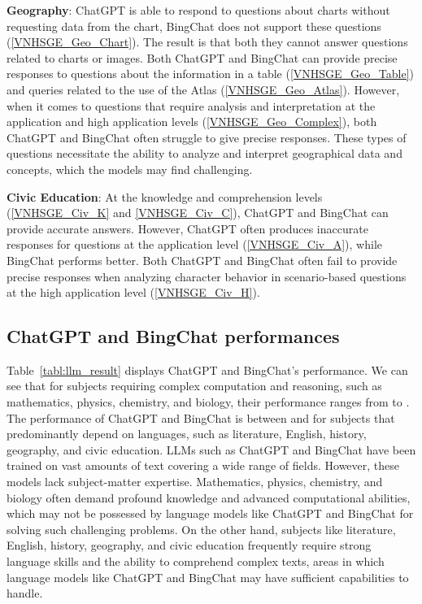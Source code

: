 \documentclass{article}
\begin{document}
{	\textbf{Geography}: ChatGPT is able to respond to questions about charts without requesting data from the chart, BingChat does not support these questions (\ref{VNHSGE_Geo_Chart}). The result is that both they cannot answer questions related to charts or images. Both ChatGPT and BingChat can provide precise responses to questions about the information in a table (\ref{VNHSGE_Geo_Table}) and queries related to the use of the Atlas (\ref{VNHSGE_Geo_Atlas}). However, when it comes to questions that require analysis and interpretation at the application and high application levels (\ref{VNHSGE_Geo_Complex}), both ChatGPT and BingChat often struggle to give precise responses. These types of questions necessitate the ability to analyze and interpret geographical data and concepts, which the models may find challenging.  
	
 
	
	\textbf{Civic Education}: At the knowledge and comprehension levels (\ref{VNHSGE_Civ_K} and \ref{VNHSGE_Civ_C}), ChatGPT and BingChat can provide accurate answers. However, ChatGPT often produces inaccurate responses for questions at the application level (\ref{VNHSGE_Civ_A}), while BingChat performs better. Both ChatGPT and BingChat often fail to provide precise responses when analyzing character behavior in scenario-based questions at the high application level (\ref{VNHSGE_Civ_H}).
	
	\subsection{ChatGPT and BingChat performances} 
	
	Table~\ref{tabl:llm_result} displays ChatGPT and BingChat's performance. We can see that for subjects requiring complex computation and reasoning, such as mathematics, physics, chemistry, and biology, their performance ranges from  to . The performance of ChatGPT and BingChat is between  and  for subjects that predominantly depend on languages, such as literature, English, history, geography, and civic education. LLMs such as ChatGPT and BingChat have been trained on vast amounts of text covering a wide range of fields. However, these models lack subject-matter expertise. Mathematics, physics, chemistry, and biology often demand profound knowledge and advanced computational abilities, which may not be possessed by language models like ChatGPT and BingChat for solving such challenging problems. On the other hand, subjects like literature, English, history, geography, and civic education frequently require strong language skills and the ability to comprehend complex texts, areas in which language models like ChatGPT and BingChat may have sufficient capabilities to handle.
	
}
\end{document}
